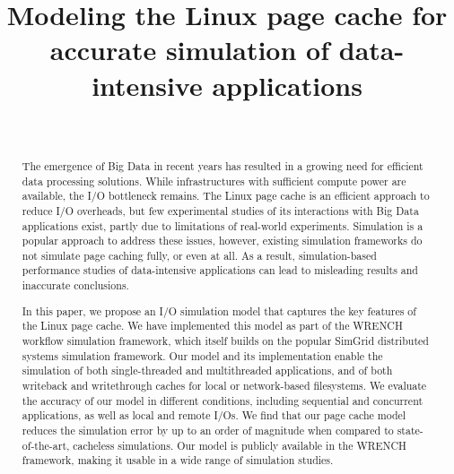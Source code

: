\documentclass[conference]{IEEEtran}
\newcommand{\simgrid}{SimGrid\xspace}
\newcommand{\wrench}{WRENCH\xspace}
\begin{document}
\title{Modeling the Linux page cache for accurate simulation of data-intensive applications}

\author{
  \\
}

\maketitle

    \begin{abstract}

    The emergence of Big Data in recent years has resulted in a growing
    need for efficient data processing solutions. While infrastructures
    with sufficient compute power are available,
    the I/O bottleneck remains. The Linux page cache is an efficient
    approach to reduce I/O overheads, but few
    experimental studies of its interactions with Big Data applications exist,
    partly due to limitations of
    real-world experiments. Simulation is a popular approach to address
    these issues, however, existing simulation frameworks do not simulate
    page caching fully, or even at all.  As a result, simulation-based
    performance studies of data-intensive applications can lead to misleading
    results and inaccurate conclusions.

    In this paper, we propose an I/O simulation model that captures
    the key features of the Linux page cache. We have implemented this model
    as part of the \wrench workflow simulation framework, which itself
    builds on the popular \simgrid distributed systems simulation
    framework. Our model and its implementation enable the simulation
    of both single-threaded and multithreaded applications, and of both
    writeback and writethrough caches for local or network-based
    filesystems. We evaluate the accuracy of our model in different
    conditions, including sequential and concurrent applications, as
    well as local and remote I/Os. We find that our page cache model
    reduces the simulation error by up to an order of magnitude when
    compared to state-of-the-art, cacheless simulations. Our model is publicly available in the 
    \wrench framework, making it usable in a wide range of simulation studies.

    \end{abstract}
\end{document}
